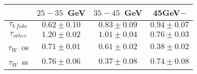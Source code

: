 \centering
\begin{tabular}{|c|c|c|c|} \hline
 & $25-35$~GeV & $35-45$~GeV & 45GeV$-$\\\hline
$\tau_{b~fake}$ & $0.62\pm0.10$ & $0.83\pm0.09$ & $0.94\pm0.07$\\\hline
$\tau_{other}$ & $1.20\pm0.02$ & $1.01\pm0.04$ & $0.76\pm0.03$\\\hline
$\tau_{W}$~os & $0.71\pm0.01$ & $0.61\pm0.02$ & $0.38\pm0.02$\\\hline
$\tau_{W}$~ss & $0.76\pm0.06$ & $0.37\pm0.08$ & $0.74\pm0.08$\\\hline
\end{tabular}
